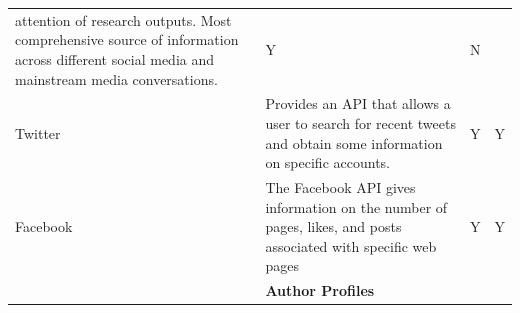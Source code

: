 \documentclass[]{krantz}
\begin{document}
\begin{longtable}[]{@{}llcc@{}}
\begin{minipage}[t]{0.74\columnwidth}
attention of research outputs. Most comprehensive source of information
across different social media and mainstream media conversations.\strut
\end{minipage} & \begin{minipage}[t]{0.02\columnwidth}\centering\strut
Y\strut
\end{minipage} & \begin{minipage}[t]{0.02\columnwidth}\centering\strut
N\strut
\end{minipage}\tabularnewline
\begin{minipage}[t]{0.10\columnwidth}\raggedright\strut
Twitter\strut
\end{minipage} & \begin{minipage}[t]{0.74\columnwidth}\raggedright\strut
Provides an API that allows a user to search for recent tweets and
obtain some information on specific accounts.\strut
\end{minipage} & \begin{minipage}[t]{0.02\columnwidth}\centering\strut
Y\strut
\end{minipage} & \begin{minipage}[t]{0.02\columnwidth}\centering\strut
Y\strut
\end{minipage}\tabularnewline
\begin{minipage}[t]{0.10\columnwidth}\raggedright\strut
Facebook\strut
\end{minipage} & \begin{minipage}[t]{0.74\columnwidth}\raggedright\strut
The Facebook API gives information on the number of pages, likes, and
posts associated with specific web pages\strut
\end{minipage} & \begin{minipage}[t]{0.02\columnwidth}\centering\strut
Y\strut
\end{minipage} & \begin{minipage}[t]{0.02\columnwidth}\centering\strut
Y\strut
\end{minipage}\tabularnewline
\begin{minipage}[t]{0.10\columnwidth}\raggedright\strut
\strut
\end{minipage} & \begin{minipage}[t]{0.74\columnwidth}\raggedright\strut
\textbf{Author Profiles}\strut
\end{minipage} & \begin{minipage}[t]{0.02\columnwidth}\centering\strut
\strut
\end{minipage} & \begin{minipage}[t]{0.02\columnwidth}\centering\strut

\end{minipage}
\end{longtable}
\end{document}
